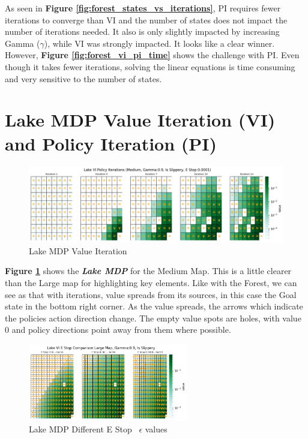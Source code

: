 \documentclass[letterpaper]{article} %
\begin{document}
As seen in \textbf{Figure \ref{fig:forest_states_vs_iterations}}, PI requires fewer iterations to converge than VI and the number of states does not impact the number of iterations needed.  It also is only slightly impacted by increasing Gamma ($\gamma$), while VI was strongly impacted.  It looks like a clear winner.  However,  \textbf{Figure \ref{fig:forest_vi_pi_time}} shows the challenge with PI.  Even though it takes fewer iterations, solving the linear equations is time consuming and very sensitive to the number of states.

\section{Lake MDP Value Iteration (VI) and Policy Iteration (PI)}


\begin{figure}[!htb]
\centering
\includegraphics[width=7in]{Figures/Lake_VI_Policy_Iterations_Medium__Gamma_0_9__Is_Slippery__E_Stop_0_0001_Iter_0_to_13_.png}
\caption{Lake MDP Value Iteration}
\label{fig:lake_vi}
\end{figure}

\textbf{Figure \ref{fig:lake_vi}} shows the \textbf{\emph{Lake MDP}} for the Medium Map.  This is a little clearer than the Large map for highlighting key elements.  Like with the Forest, we can see as that with iterations, value spreads from its sources, in this case the Goal state in the bottom right corner.  As the value spreads, the arrows which indicate the policies action direction change.  The empty value spots are holes, with value 0 and policy directions point away from them where possible.  


\begin{figure}[!htb]
\centering
\includegraphics[width=2.75in]{Figures/Lake_VI_E_Stop_Comparison_Large_Map__Gamma_0_9__Is_Slippery_gamma_0_01_to_0_0001_.png}
\caption{Lake MDP Different E Stop \ $\epsilon$ values}
\label{fig:lake_vi_estop}
\end{figure}
\end{document}
